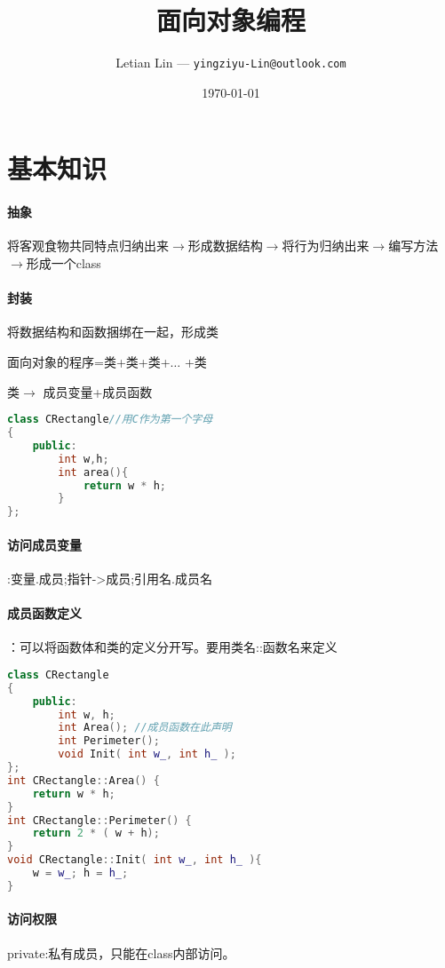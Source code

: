 \documentclass[UTF8]{ctexart}
\title{
	面向对象编程
}
\author{
	Letian Lin --- \texttt{yingziyu-Lin@outlook.com}
}
\date{\today}
\begin{document}
\maketitle
\section{基本知识}

\paragraph{抽象}将客观食物共同特点归纳出来$\rightarrow$形成数据结构$\rightarrow$将行为归纳出来$\rightarrow$编写方法$\rightarrow$形成一个class

\paragraph{封装}将数据结构和函数捆绑在一起，形成类

面向对象的程序=类+类+类+$\dots$ +类

类$\rightarrow$ 成员变量+成员函数

\begin{lstlisting}[language=C++]
class CRectangle//用C作为第一个字母
{
	public:
		int w,h;
		int area(){
			return w * h;
		}
};
\end{lstlisting}

\paragraph{访问成员变量}:变量.成员;指针->成员;引用名.成员名

\paragraph{成员函数定义}：可以将函数体和类的定义分开写。要用类名::函数名来定义
\begin{lstlisting}[language=C++]
class CRectangle
{
	public:
		int w, h;
		int Area(); //成员函数在此声明
		int Perimeter();
		void Init( int w_, int h_ );
};
int CRectangle::Area() {
	return w * h;
}
int CRectangle::Perimeter() {
	return 2 * ( w + h);
}
void CRectangle::Init( int w_, int h_ ){
	w = w_; h = h_;
}
\end{lstlisting}

\paragraph{访问权限}private:私有成员，只能在class内部访问。
\end{document}
